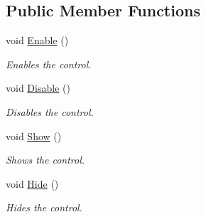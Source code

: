 \subsection*{Public Member Functions}
\begin{DoxyCompactItemize}
\item 
void \hyperlink{interface_tri_devs_1_1_tri_engine2_d_1_1_u_i_1_1_i_control_ad846f81cb6d55f85d58b0b7471db8adf}{Enable} ()
\begin{DoxyCompactList}\small\item\em Enables the control. \end{DoxyCompactList}\item 
void \hyperlink{interface_tri_devs_1_1_tri_engine2_d_1_1_u_i_1_1_i_control_a091f619c7d69476dc13c9b826ded56dd}{Disable} ()
\begin{DoxyCompactList}\small\item\em Disables the control. \end{DoxyCompactList}\item 
void \hyperlink{interface_tri_devs_1_1_tri_engine2_d_1_1_u_i_1_1_i_control_a552f33edcdca3292d87d0cf3f4223ad5}{Show} ()
\begin{DoxyCompactList}\small\item\em Shows the control. \end{DoxyCompactList}\item 
void \hyperlink{interface_tri_devs_1_1_tri_engine2_d_1_1_u_i_1_1_i_control_ac412cfe26fd89c93f4321651a4c57e4d}{Hide} ()
\begin{DoxyCompactList}\small\item\em Hides the control. \end{DoxyCompactList}\end{DoxyCompactItemize}
